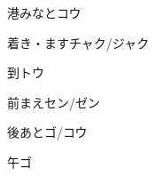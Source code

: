 \documentclass[a4paper,lualatex,ja=standard,base=10pt]{bxjsarticle}
\begin{document}
\begin{kanjicard}{港}{みなと}{コウ}
\end{kanjicard}

\begin{kanjicard}{着}{き・ます}{チャク/ジャク}
\end{kanjicard}

\begin{kanjicard}{到}{}{トウ}
\end{kanjicard}

\begin{kanjicard}{前}{まえ}{セン/ゼン}
\end{kanjicard}

\begin{kanjicard}{後}{あと}{ゴ/コウ}
\end{kanjicard}

\begin{kanjicard}{午}{}{ゴ}
\end{kanjicard}
\end{document}
